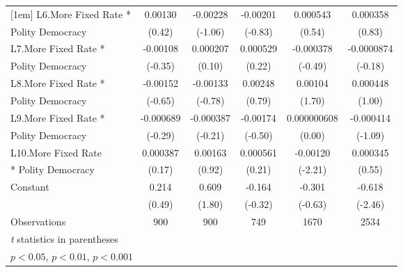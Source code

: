 {\begin{tabular}{l*{5}{c}}
[1em]
L6.More Fixed Rate *&     0.00130         &    -0.00228         &    -0.00201         &    0.000543         &    0.000358         \\
Polity Democracy    &      (0.42)         &     (-1.06)         &     (-0.83)         &      (0.54)         &      (0.83)         \\
[1em]
L7.More Fixed Rate *&    -0.00108         &    0.000207         &    0.000529         &   -0.000378         &  -0.0000874         \\
Polity Democracy    &     (-0.35)         &      (0.10)         &      (0.22)         &     (-0.49)         &     (-0.18)         \\
[1em]
L8.More Fixed Rate *&    -0.00152         &    -0.00133         &     0.00248         &     0.00104         &    0.000448         \\
Polity Democracy    &     (-0.65)         &     (-0.78)         &      (0.79)         &      (1.70)         &      (1.00)         \\
[1em]
L9.More Fixed Rate *&   -0.000689         &   -0.000387         &    -0.00174         & 0.000000608         &   -0.000414         \\
Polity Democracy    &     (-0.29)         &     (-0.21)         &     (-0.50)         &      (0.00)         &     (-1.09)         \\
[1em]
L10.More Fixed Rate &    0.000387         &     0.00163         &    0.000561         &    -0.00120\sym{*}  &    0.000345         \\
* Polity Democracy  &      (0.17)         &      (0.92)         &      (0.21)         &     (-2.21)         &      (0.55)         \\
[1em]
Constant            &       0.214         &       0.609         &      -0.164         &      -0.301         &      -0.618\sym{*}  \\
                    &      (0.49)         &      (1.80)         &     (-0.32)         &     (-0.63)         &     (-2.46)         \\
\hline
Observations        &         900         &         900         &         749         &        1670         &        2534         \\
\hline\hline
\multicolumn{6}{l}{\footnotesize \textit{t} statistics in parentheses}\\
\multicolumn{6}{l}{\footnotesize \sym{*} \(p<0.05\), \sym{**} \(p<0.01\), \sym{***} \(p<0.001\)}\\
\end{tabular}
}
